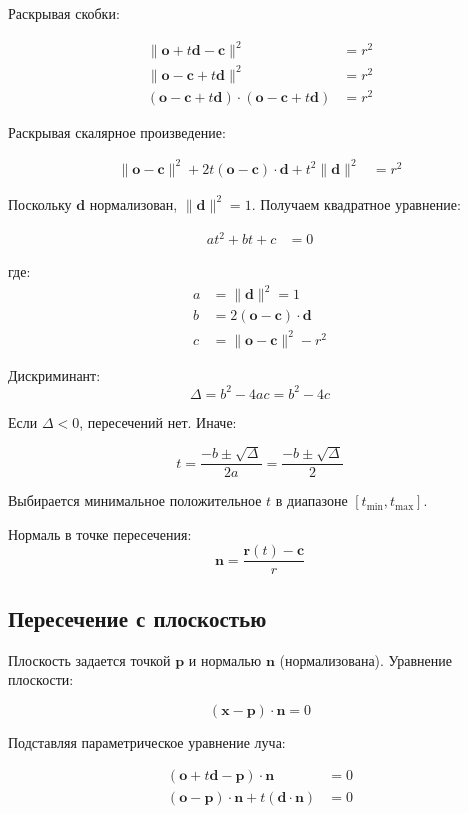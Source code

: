 \documentclass[14pt, a4paper]{extarticle}
\begin{document}
Раскрывая скобки:

\begin{align}
\|\mathbf{o} + t\mathbf{d} - \mathbf{c}\|^2 &= r^2 \\
\|\mathbf{o} - \mathbf{c} + t\mathbf{d}\|^2 &= r^2 \\
(\mathbf{o} - \mathbf{c} + t\mathbf{d}) \cdot (\mathbf{o} - \mathbf{c} + t\mathbf{d}) &= r^2
\end{align}

Раскрывая скалярное произведение:

\begin{align}
\|\mathbf{o} - \mathbf{c}\|^2 + 2t(\mathbf{o} - \mathbf{c}) \cdot \mathbf{d} + t^2\|\mathbf{d}\|^2 &= r^2
\end{align}

Поскольку $\mathbf{d}$ нормализован, $\|\mathbf{d}\|^2 = 1$. Получаем квадратное уравнение:

\begin{align}
at^2 + bt + c &= 0
\end{align}

где:
\begin{align}
a &= \|\mathbf{d}\|^2 = 1 \\
b &= 2(\mathbf{o} - \mathbf{c}) \cdot \mathbf{d} \\
c &= \|\mathbf{o} - \mathbf{c}\|^2 - r^2
\end{align}

Дискриминант:
\[
\Delta = b^2 - 4ac = b^2 - 4c
\]

Если $\Delta < 0$, пересечений нет. Иначе:

\[
t = \frac{-b \pm \sqrt{\Delta}}{2a} = \frac{-b \pm \sqrt{\Delta}}{2}
\]

Выбирается минимальное положительное $t$ в диапазоне $[t_{\min}, t_{\max}]$.

Нормаль в точке пересечения:
\[
\mathbf{n} = \frac{\mathbf{r}(t) - \mathbf{c}}{r}
\]

\subsection{Пересечение с плоскостью}

Плоскость задается точкой $\mathbf{p}$ и нормалью $\mathbf{n}$ (нормализована). Уравнение плоскости:

\[
(\mathbf{x} - \mathbf{p}) \cdot \mathbf{n} = 0
\]

Подставляя параметрическое уравнение луча:

\begin{align}
(\mathbf{o} + t\mathbf{d} - \mathbf{p}) \cdot \mathbf{n} &= 0 \\
(\mathbf{o} - \mathbf{p}) \cdot \mathbf{n} + t(\mathbf{d} \cdot \mathbf{n}) &= 0
\end{align}
\end{document}
